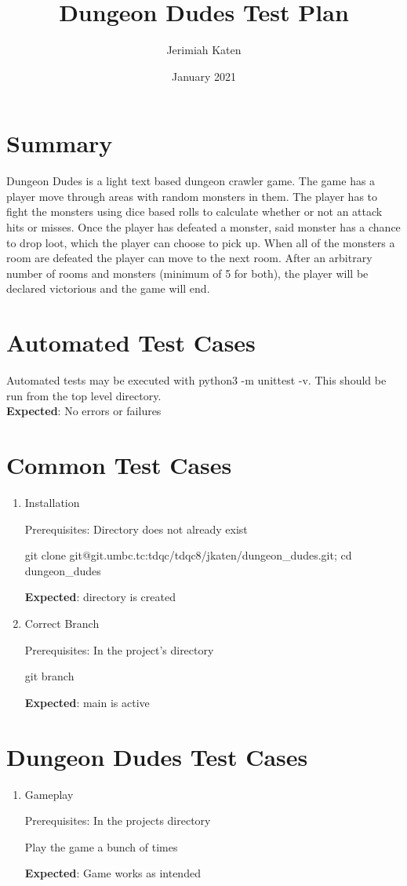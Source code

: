 \documentclass{article}
\title{Dungeon Dudes Test Plan}
\author{Jerimiah Katen}
\date{January 2021}
\begin{document}
\maketitle

\section{Summary}

Dungeon Dudes is a light text based dungeon crawler game. The game has a player move through areas with random monsters in them. The player has to fight the monsters using dice based rolls to calculate whether or not an attack hits or misses. Once the player has defeated a monster, said monster has a chance to drop loot, which the player can choose to pick up. When all of the monsters a room are defeated the player can move to the next room. After an arbitrary number of rooms and monsters (minimum of 5 for both), the player will be declared victorious and the game will end.

\section{Automated Test Cases}

Automated tests may be executed with {\footnotesize python3 -m unittest -v}. This should be run from the top level directory.
\\[.5cm]
\textbf{Expected}: No errors or failures

\section{Common Test Cases}


\begin{enumerate}
    \item Installation
    
    Prerequisites: Directory does not already exist

    {\footnotesize git clone git@git.umbc.tc:tdqc/tdqc8/jkaten/dungeon_dudes.git; cd dungeon_dudes}
    
    \textbf{Expected}: directory is created

    \item Correct Branch
    
    Prerequisites: In the project's directory
    
    {\footnotesize git branch}
    
    \textbf{Expected}: {\footnotesize main} is active
    
   \end{enumerate}

\section{{\footnotesize Dungeon Dudes} Test Cases}

\begin{enumerate}
    \item Gameplay
    
    Prerequisites: In the projects directory
    
    {\footnotesize Play the game a bunch of times}
    
    \textbf{Expected}: Game works as intended
    
\end{enumerate}
\end{document}
